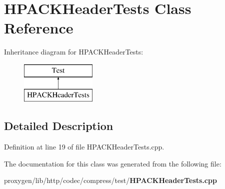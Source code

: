 \section{H\+P\+A\+C\+K\+Header\+Tests Class Reference}
\label{classHPACKHeaderTests}
Inheritance diagram for H\+P\+A\+C\+K\+Header\+Tests\+:\begin{figure}[H]
\begin{center}
\leavevmode
\includegraphics[height=2.000000cm]{classHPACKHeaderTests}
\end{center}
\end{figure}


\subsection{Detailed Description}


Definition at line 19 of file H\+P\+A\+C\+K\+Header\+Tests.\+cpp.



The documentation for this class was generated from the following file\+:\begin{DoxyCompactItemize}
\item 
proxygen/lib/http/codec/compress/test/{\bf H\+P\+A\+C\+K\+Header\+Tests.\+cpp}\end{DoxyCompactItemize}
